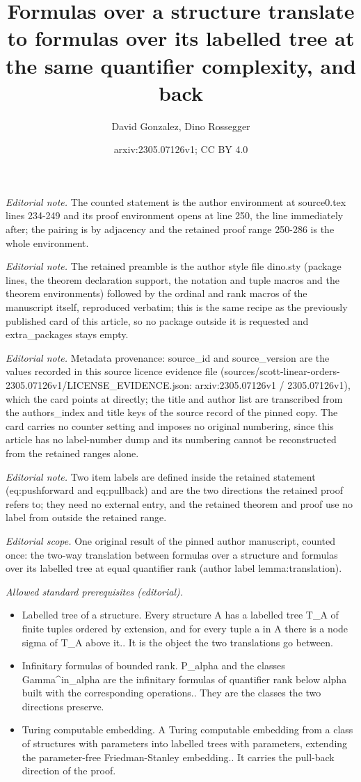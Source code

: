 \documentclass[10pt,a4paper]{amsart}
\title{Formulas over a structure translate to formulas over its labelled tree at the same quantifier complexity, and back}
\author{David Gonzalez, Dino Rossegger}
\date{arxiv:2305.07126v1; CC BY 4.0}
\begin{document}
\maketitle
\noindent\textit{Editorial note.} The counted statement is the author environment at source0.tex lines 234-249 and its proof environment opens at line 250, the line immediately after; the pairing is by adjacency and the retained proof range 250-286 is the whole environment.\par\medskip
\noindent\textit{Editorial note.} The retained preamble is the author style file dino.sty (package lines, the theorem declaration support, the notation and tuple macros and the theorem environments) followed by the ordinal and rank macros of the manuscript itself, reproduced verbatim; this is the same recipe as the previously published card of this article, so no package outside it is requested and extra\_packages stays empty.\par\medskip
\noindent\textit{Editorial note.} Metadata provenance: source\_id and source\_version are the values recorded in this source licence evidence file (sources/scott-linear-orders-2305.07126v1/LICENSE\_EVIDENCE.json: arxiv:2305.07126v1 / 2305.07126v1), which the card points at directly; the title and author list are transcribed from the authors\_index and title keys of the source record of the pinned copy. The card carries no counter setting and imposes no original numbering, since this article has no label-number dump and its numbering cannot be reconstructed from the retained ranges alone.\par\medskip
\noindent\textit{Editorial note.} Two item labels are defined inside the retained statement (eq:pushforward and eq:pullback) and are the two directions the retained proof refers to; they need no external entry, and the retained theorem and proof use no label from outside the retained range.\par\medskip
\noindent\textit{Editorial scope.} One original result of the pinned author manuscript, counted once: the two-way translation between formulas over a structure and formulas over its labelled tree at equal quantifier rank (author label lemma:translation).\par\medskip
\noindent\textit{Allowed standard prerequisites (editorial).}\begin{itemize}
\item Labelled tree of a structure. Every structure A has a labelled tree T\_A of finite tuples ordered by extension, and for every tuple a in A there is a node sigma of T\_A above it.. It is the object the two translations go between.
\item Infinitary formulas of bounded rank. P\_alpha and the classes Gamma\textasciicircum{}in\_alpha are the infinitary formulas of quantifier rank below alpha built with the corresponding operations.. They are the classes the two directions preserve.
\item Turing computable embedding. A Turing computable embedding from a class of structures with parameters into labelled trees with parameters, extending the parameter-free Friedman-Stanley embedding.. It carries the pull-back direction of the proof.
\end{itemize}\medskip
\end{document}
